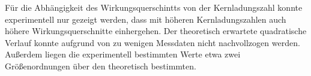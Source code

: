 Für die Abhängigkeit des Wirkungsquerschintts von der Kernladungszahl konnte experimentell
nur gezeigt werden, dass mit höheren Kernladungszahlen auch höhere Wirkungsquerschnitte
einhergehen. Der theoretisch erwartete quadratische Verlauf konnte aufgrund von zu
wenigen Messdaten nicht nachvollzogen werden. Außerdem liegen die experimentell
bestimmten Werte etwa zwei Größenordnungen über den theoretisch bestimmten.


%
%
%
%
%
